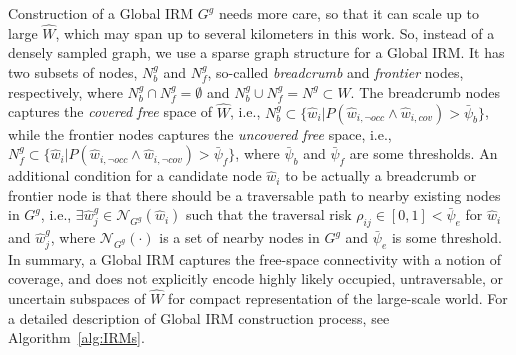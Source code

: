 \documentclass[letterpaper]{article} %
\newcommand{\phdone}[1]{} %
\begin{document}
\phdone{Global IRM}
Construction of a Global IRM $G^g$ needs more care, so that it can scale up to large $\hat{W}$, which may span up to several kilometers in this work.
So, instead of a densely sampled graph, we use a sparse graph structure for a Global IRM.
%
It has two subsets of nodes, $N^g_b$ and $N^g_f$, so-called \textit{breadcrumb} and \textit{frontier} nodes, respectively, where $N^g_b \cap N^g_f = \emptyset$ and $N^g_b \cup N^g_f = N^g \! \subset \! \hat{W}$.
%
The breadcrumb nodes captures the \textit{covered free} space of $\hat{W}$, i.e., $N^g_b \subset \{\hat{w}_i | P(\hat{w}_{i,\neg occ} \wedge \hat{w}_{i,cov}) > \bar{\psi}_b\}$, while
the frontier nodes captures the \textit{uncovered free} space, i.e., $N^g_f \subset \{\hat{w}_i | P(\hat{w}_{i,\neg occ} \wedge \hat{w}_{i,\neg cov}) > \bar{\psi}_f\}$,
where $\bar{\psi}_b$ and $\bar{\psi}_f$ are some thresholds.
%
An additional condition for a candidate node $\hat{w}_i$ to be actually a breadcrumb or frontier node is that there should be a traversable path to nearby existing nodes in $G^g$, i.e., $\exists \hat{w}^g_j \in \mathcal{N}_{G^g}(\hat{w}_i)$ such that the traversal risk $\rho_{ij} \in [0, 1] < \bar{\psi}_e$ for $\hat{w}_i$ and $\hat{w}^g_j$, where $\mathcal{N}_{G^g}(\cdot)$ is a set of nearby nodes in $G^g$ and $\bar{\psi}_e$ is some threshold.
%
In summary, a Global IRM captures the free-space connectivity with a notion of coverage, and does not explicitly encode highly likely occupied, untraversable, or uncertain subspaces of $\hat{W}$ for compact representation of the large-scale world.
%
For a detailed description of Global IRM construction process, see Algorithm~\ref{alg:IRMs}.
\end{document}
